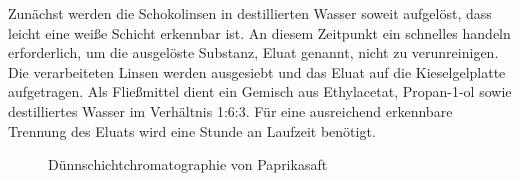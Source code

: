 \documentclass[11pt]{scrreprt}
\begin{document}
 
Zunächst werden die Schokolinsen in destillierten Wasser soweit aufgelöst, dass leicht eine weiße Schicht erkennbar ist. An diesem Zeitpunkt ein schnelles handeln erforderlich, um die ausgelöste Substanz, Eluat genannt, nicht zu verunreinigen. Die  verarbeiteten Linsen werden ausgesiebt und das Eluat auf die Kieselgelplatte aufgetragen. Als Fließmittel dient ein Gemisch aus Ethylacetat, Propan-1-ol sowie destilliertes Wasser im Verhältnis 1:6:3. Für eine ausreichend erkennbare Trennung des Eluats wird eine Stunde an Laufzeit benötigt.
\begin{figure}[ht!]
\centering
{}
	\caption{Dünnschichtchromatographie von Paprikasaft}
	\label{img:paprika}
\end{figure}
\end{document}
